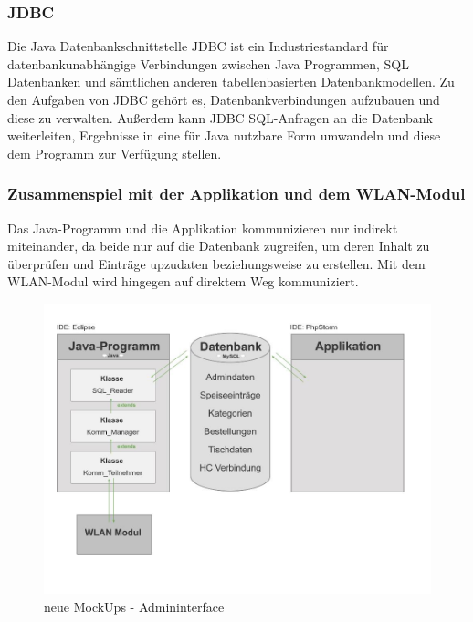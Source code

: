 	   \subsubsection{JDBC}

Die Java Datenbankschnittstelle {JDBC\cite{jdbc}} ist ein Industriestandard für datenbankunabhängige Verbindungen zwischen Java Programmen, SQL Datenbanken und sämtlichen anderen tabellenbasierten Datenbankmodellen. Zu den Aufgaben von JDBC gehört es, Datenbankverbindungen aufzubauen und diese zu verwalten. Außerdem kann JDBC  SQL-Anfragen an die Datenbank weiterleiten, Ergebnisse in eine für Java nutzbare Form umwandeln und diese dem Programm zur Verfügung stellen.

	   \subsubsection{Zusammenspiel mit der Applikation und dem WLAN-Modul}
Das Java-Programm und die Applikation kommunizieren nur indirekt miteinander, da beide nur auf die Datenbank zugreifen, um deren Inhalt zu überprüfen und Einträge upzudaten beziehungsweise zu erstellen.
Mit dem WLAN-Modul wird hingegen auf direktem Weg kommuniziert.
			\begin{figure}[H]
			\begin{centering}
			\includegraphics[width = 1\textwidth]{Bilder/Jok_zusammenspiel_java.jpg}
			\par\end{centering}
			\caption{neue MockUps - Admininterface}
			\label{neue MockUps - Admininterface}
			\end{figure}

